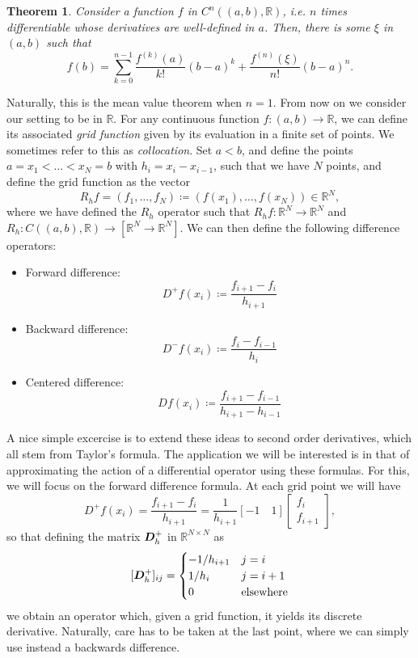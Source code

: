 \documentclass{article}
\newcommand{\mat}{\matrixsym}
\newcommand{\R}{\mathbb{R}}
\newtheorem{theorem}{Theorem}
\begin{document}
\begin{theorem}\label{thm:taylor}
    Consider a function $f$ in $C^n((a,b), \R)$, i.e. $n$ times differentiable whose derivatives are well-defined in $a$. Then, there is some $\xi$ in $(a,b)$ such that
    $$ f(b) = \sum_{k=0}^{n-1}\frac{f^{(k)}(a)}{k!}(b-a)^k + \frac{f^{(n)}(\xi)}{n!}(b-a)^n. $$
\end{theorem}
Naturally, this is the mean value theorem when $n=1$. From now on we consider our setting to be in $\R$. For any continuous function $f:(a,b)\to \R$, we can define its associated \emph{grid function} given by its evaluation in a finite set of points. We sometimes refer to this as \emph{collocation}. Set $a<b$, and define the points $a=x_1<\hdots<x_N=b$ with $h_i=x_{i}-x_{i-1}$, such that we have $N$ points, and define the grid function as the vector
    $$ R_hf = (f_1, \hdots, f_N) \coloneqq (f(x_1), \hdots, f(x_N)) \in \R^N,$$
    where we have defined the $R_h$ operator such that $R_hf:\R^N \to \R^N$ and $R_h:C((a,b),\R)\to [\R^N\to\R^N]$.  We can then define the following difference operators: 
    \begin{itemize}
        \item Forward difference: 
            $$ D^+f(x_i) \coloneqq \frac{f_{i+1} - f_i}{h_{i+1}} $$
        \item Backward difference: 
            $$ D^-f(x_i) \coloneqq \frac{f_{i} - f_{i-1}}{h_{i}} $$
        \item Centered difference:
            $$ Df(x_i) \coloneqq \frac{f_{i+1} - f_{i-1}}{h_{i+1} - h_{i-1}} $$

    \end{itemize}
A nice simple excercise is to extend these ideas to second order derivatives, which all stem from Taylor's formula. The application we will be interested is in that of approximating the action of a differential operator using these formulas. For this, we will focus on the forward difference formula. At each grid point we will have
$$ D^+f(x_i) = \frac{f_{i+1} - f_i}{h_{i+1}} = \frac 1{h_{i+1}} [-1\quad 1]\begin{bmatrix}f_i \\ f_{i+1}\end{bmatrix}, $$
so that defining the matrix $\mat D_h^+$ in $\R^{N\times N}$ as
$$ [\mat D_h^+]_{ij} = \begin{cases} -1/h_{i+1} & j=i \\ 1/h_i  & j=i+1 \\ 0 & \text{elsewhere} \end{cases} $$
we obtain an operator which, given a grid function, it yields its discrete derivative. Naturally, care has to be taken at the last point, where we can simply use instead a backwards difference. 
\end{document}
